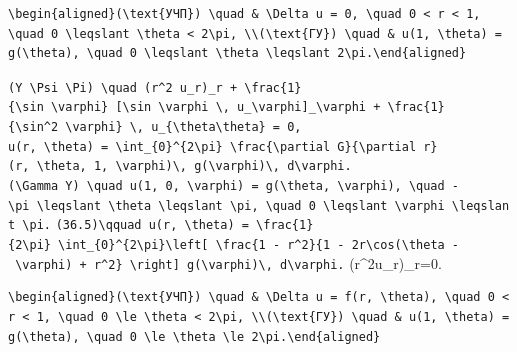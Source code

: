 \documentclass[
  ukrainian,
]{article}
\begin{document}
\begin{verbatim}
\begin{aligned}(\text{УЧП}) \quad & \Delta u = 0, \quad 0 < r < 1, \quad 0 \leqslant \theta < 2\pi, \\(\text{ГУ}) \quad & u(1, \theta) = g(\theta), \quad 0 \leqslant \theta \leqslant 2\pi.\end{aligned}
\end{verbatim}

\texttt{(Y\ \textbackslash{}Psi\ \textbackslash{}Pi)\ \textbackslash{}quad\ (r\^{}2\ u\_r)\_r\ +\ \textbackslash{}frac\{1\}\{\textbackslash{}sin\ \textbackslash{}varphi\}\ {[}\textbackslash{}sin\ \textbackslash{}varphi\ \textbackslash{},\ u\_\textbackslash{}varphi{]}\_\textbackslash{}varphi\ +\ \textbackslash{}frac\{1\}\{\textbackslash{}sin\^{}2\ \textbackslash{}varphi\}\ \textbackslash{},\ u\_\{\textbackslash{}theta\textbackslash{}theta\}\ =\ 0,}
\texttt{u(r,\ \textbackslash{}theta)\ =\ \textbackslash{}int\_\{0\}\^{}\{2\textbackslash{}pi\}\ \textbackslash{}frac\{\textbackslash{}partial\ G\}\{\textbackslash{}partial\ r\}(r,\ \textbackslash{}theta,\ 1,\ \textbackslash{}varphi)\textbackslash{},\ g(\textbackslash{}varphi)\textbackslash{},\ d\textbackslash{}varphi.}
\texttt{(\textbackslash{}Gamma\ Y)\ \textbackslash{}quad\ u(1,\ 0,\ \textbackslash{}varphi)\ =\ g(\textbackslash{}theta,\ \textbackslash{}varphi),\ \textbackslash{}quad\ -\textbackslash{}pi\ \textbackslash{}leqslant\ \textbackslash{}theta\ \textbackslash{}leqslant\ \textbackslash{}pi,\ \textbackslash{}quad\ 0\ \textbackslash{}leqslant\ \textbackslash{}varphi\ \textbackslash{}leqslant\ \textbackslash{}pi.}
\texttt{(36.5)\textbackslash{}qquad\ u(r,\ \textbackslash{}theta)\ =\ \textbackslash{}frac\{1\}\{2\textbackslash{}pi\}\ \textbackslash{}int\_\{0\}\^{}\{2\textbackslash{}pi\}\textbackslash{}left{[}\ \textbackslash{}frac\{1\ -\ r\^{}2\}\{1\ -\ 2r\textbackslash{}cos(\textbackslash{}theta\ -\ \textbackslash{}varphi)\ +\ r\^{}2\}\ \textbackslash{}right{]}\ g(\textbackslash{}varphi)\textbackslash{},\ d\textbackslash{}varphi.}
(r\^{}2u\_r)\_r=0.

\begin{verbatim}
\begin{aligned}(\text{УЧП}) \quad & \Delta u = f(r, \theta), \quad 0 < r < 1, \quad 0 \le \theta < 2\pi, \\(\text{ГУ}) \quad & u(1, \theta) = g(\theta), \quad 0 \le \theta \le 2\pi.\end{aligned}
\end{verbatim}
\end{document}
